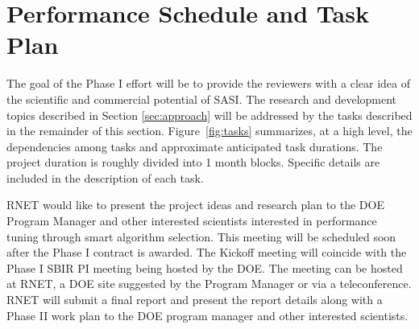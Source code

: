 \section{Performance Schedule and Task Plan}
\label{sec:taskplan}

The goal of the Phase I effort will be to provide the reviewers with a clear idea 
of the scientific and commercial potential of SASI. The research and development topics 
described in Section \ref{sec:approach} will be addressed by the tasks described in the remainder of this section. 
Figure~\ref{fig:tasks} summarizes, at a high level, the dependencies among tasks 
and approximate anticipated task durations. The project duration is roughly 
divided into 1 month blocks. Specific details are included in the description 
of each task. 

RNET would like to present the project ideas and research plan to the DOE 
Program Manager and other interested scientists interested in performance tuning
through smart algorithm selection. This meeting will 
be scheduled soon after the Phase I contract is awarded. The Kickoff meeting 
will coincide with the Phase I SBIR PI meeting being hosted by the DOE. The 
meeting can be hosted at RNET, a DOE site suggested by the Program Manager or 
via a teleconference. RNET will submit a final report and present the report 
details along with a Phase II work plan to the DOE program manager and other 
interested scientists.

%

\setcounter{taskCount}{0}

\label{task:1}
